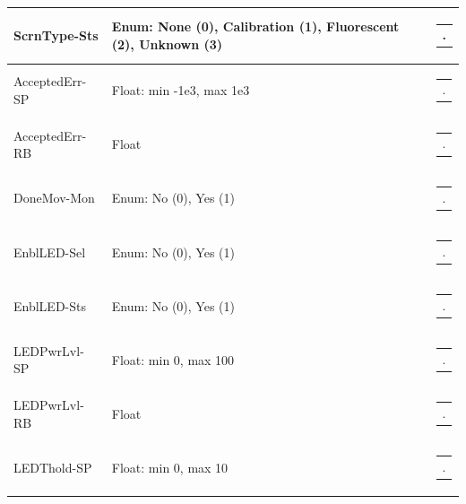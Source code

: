 \documentclass[openany]{article}
\begin{document}
\begin{longtable}{| m{4.5cm} m{2.5cm}  m{7.0cm} |}
        ScrnType-Sts & Enum: None (0), Calibration (1), Fluorescent (2), Unknown (3) & \begin{tabular}{@{}m{6cm}@{}}
                .
            \end{tabular} \hypertarget{pv:accepted-err}{}\\ \hline
        AcceptedErr-SP & Float: min -1e3, max 1e3 & \begin{tabular}{@{}m{6cm}@{}}
                .
            \end{tabular} \hypertarget{}{}\\ \hline
        AcceptedErr-RB & Float & \begin{tabular}{@{}m{6cm}@{}}
                .
            \end{tabular} \hypertarget{pv:done-mov-mon}{}\\ \hline
        DoneMov-Mon & Enum: No (0), Yes (1) & \begin{tabular}{@{}m{6cm}@{}}
                .
            \end{tabular} \hypertarget{pv:enbl-led}{}\\ \hline
        EnblLED-Sel & Enum: No (0), Yes (1) & \begin{tabular}{@{}m{6cm}@{}}
                .
            \end{tabular} \hypertarget{}{}\\ \hline
        EnblLED-Sts & Enum: No (0), Yes (1) & \begin{tabular}{@{}m{6cm}@{}}
                .
            \end{tabular} \hypertarget{pv:led-pwr-lvl}{}\\ \hline
        LEDPwrLvl-SP & Float: min 0, max 100 & \begin{tabular}{@{}m{6cm}@{}}
                .
            \end{tabular} \hypertarget{}{}\\ \hline
        LEDPwrLvl-RB & Float & \begin{tabular}{@{}m{6cm}@{}}
                .
            \end{tabular} \hypertarget{pv:led-thold}{}\\ \hline
        LEDThold-SP & Float: min 0, max 10 & \begin{tabular}{@{}m{6cm}@{}}
                .
            \end{tabular} \hypertarget{}{}\\ \hline

\end{longtable}
\end{document}
